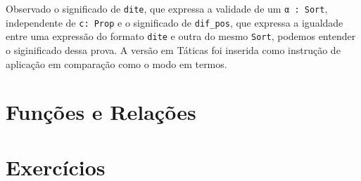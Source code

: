 Observado o significado de \lstinline{dite}, que expressa a validade de um 
\lstinline{α : Sort}, independente de \lstinline{c: Prop} e o significado 
de \lstinline{dif_pos}, que expressa a igualdade entre uma expressão do formato 
\lstinline{dite} e outra do mesmo \lstinline{Sort}, podemos entender o siginificado
dessa prova. A versão em Táticas foi inserida como instrução de aplicação em comparação
como o modo em termos. 

\section{Funções e Relações}



\section{Exercícios}
